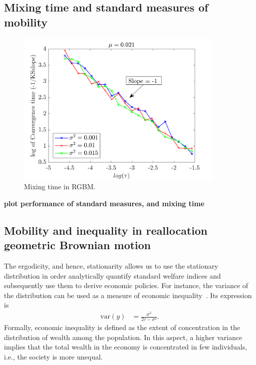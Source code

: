 \documentclass[11pt]{article}
\numberwithin{equation}{section}
\begin{document}
\subsection{Mixing time and standard measures of mobility}\label{sec:measures}

\begin{figure}[t!]
\includegraphics[width=10cm]{figs/fig_mixing_time_rgbm.png}
\caption{Mixing time in RGBM.}
\end{figure}

\textbf{plot performance of standard measures, and mixing time}
\subsection{Mobility and inequality in reallocation geometric Brownian motion}\label{sec:inequality}

The ergodicity, and hence, stationarity allows us to use the stationary distribution in order analytically quantify standard welfare indices and subsequently use them to derive economic policies. For instance, the variance of the distribution can be used as a measure of economic inequality~\cite{berman2017empirical}. Its expression is
\begin{align}
\mathrm{var}(y) &= \frac{\sigma^2}{2 \tau - \sigma^2}.
\label{eq:rgbm-var}
\end{align}
Formally, economic inequality is defined as the extent of concentration in the distribution of wealth among the population. In this aspect, a higher variance implies that the total wealth in the economy is concentrated in few individuals, i.e., the society is more unequal.
\end{document}
